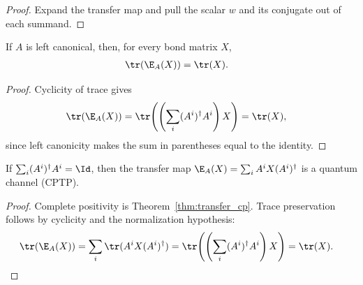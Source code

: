 \begin{proof}\leanok
    Expand the transfer map and pull the scalar $w$ and its conjugate out of
    each summand.
\end{proof}

\begin{lemma}
    \label{lem:trace_transfer_map_left_canonical}
    \leanok
    If $A$ is left canonical, then, for every bond matrix $X$,
    \begin{align}
        \tr(\E_A(X)) & =\tr(X).
        \notag
    \end{align}
\end{lemma}

\begin{proof}\leanok
    Cyclicity of trace gives
    \begin{align}
        \tr(\E_A(X))
         & =\tr\!\left(\left(\sum_i(A^i)^\dagger A^i\right)X\right)
        =\tr(X),
        \notag
    \end{align}
    since left canonicity makes the sum in parentheses equal to the identity.
\end{proof}

\begin{theorem}\label{thm:transfer_channel}
    \leanok
    If $\sum_i(A^i)^\dagger A^i=\Id$, then the transfer map
    $\E_A(X)=\sum_i A^iX(A^i)^\dagger$ is a quantum channel (CPTP).
\end{theorem}

\begin{proof}\leanok{}
    Complete positivity is Theorem~\ref{thm:transfer_cp}. Trace preservation
    follows by cyclicity and the normalization hypothesis:
    \begin{align}
        \tr(\E_A(X))
         & =\sum_i\tr(A^iX(A^i)^\dagger)
        =\tr\!\left(\left(\sum_i(A^i)^\dagger A^i\right)X\right)
        =\tr(X).
        \notag
    \end{align}
\end{proof}
